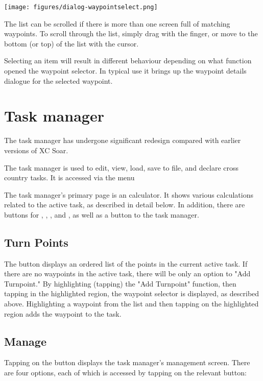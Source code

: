 \begin{center}
\texttt{[image: figures/dialog-waypointselect.png]}
\end{center}

The list can be scrolled if there is more than one screen full of
matching waypoints.  To scroll through the list, simply drag with the finger, or
move to the bottom (or top) of the list with the cursor.   

Selecting an item will result in different behaviour
depending on what function opened the waypoint selector.  In typical
use it brings up the waypoint details dialogue for the selected
waypoint.

\section{Task manager}\label{sec:task-manager-dialog}
\begin{it}  The task manager has undergone significant redesign compared with 
earlier versions of XC Soar.\end{it}

The task manager is used to edit, view, load, save to file, and declare cross
country tasks. It is accessed via the menu
\begin{quote}
\blink{}
\end{quote} 

The task manager's primary page is an calculator. It shows various calculations 
related to the active task, as described in detail below.  In addition, there 
are buttons for , , , 
and , as well as a button to  the task manager.

\subsection*{Turn Points}
The  button displays an ordered list of the points in the 
current active task.  If there are no waypoints in the active task, there 
will be only an option to "Add Turnpoint."  By highlighting (tapping) the 
"Add Turnpoint" function, then tapping in the highlighted region, the waypoint 
selector is displayed, as described above.  Highlighting a waypoint from the 
list and then tapping on the highlighted region adds the waypoint to the task.

\subsection*{Manage}
Tapping on the  button displays the task manager's management 
screen.  There are four options, each of which is accessed by tapping on the 
relevant button:

